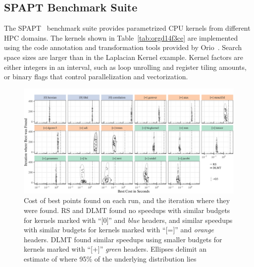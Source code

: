 \documentclass[conference]{IEEEtran}
\begin{document}
\subsection{SPAPT Benchmark Suite}
\label{sec:orge74ca1f}
The SPAPT~\cite{balaprakash2012spapt} benchmark  suite provides parametrized CPU
kernels from  different HPC domains.  The kernels shown  in Table~\ref{tab:orgd14f3ce}
are implemented using  the code annotation and transformation  tools provided by
Orio~\cite{hartono2009annotation}.  Search space  sizes are  larger than  in the
Laplacian Kernel  example. Kernel  factors are either  integers in  an interval,
such as loop unrolling and register tiling amounts, or binary flags that control
parallelization and vectorization.

\begin{figure}[p]
\centering
\includegraphics[width=\textwidth]{./img/iteration_best_comparison.pdf}
\caption{\label{fig:org0536b62}
Cost of best points found on each run, and the iteration where they were found. RS and DLMT found no speedups with similar budgets for kernels marked with ``[0]'' and \emph{blue} headers, and similar speedups with similar budgets for kernels marked with ``[=]'' and \emph{orange} headers. DLMT found similar speedups using smaller budgets for kernels marked with ``[+]'' \emph{green} headers. Ellipses delimit an estimate of where 95\% of the underlying distribution lies}
\end{figure}
\end{document}
